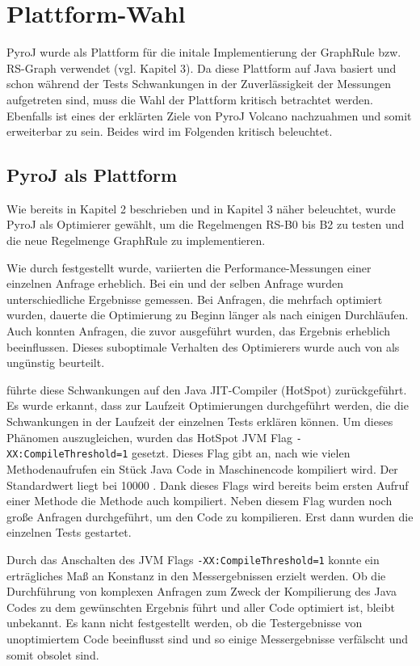 \section{Plattform-Wahl}

PyroJ wurde als Plattform für die initale Implementierung der GraphRule bzw. RS-Graph verwendet (vgl. Kapitel 3). Da diese Plattform auf Java basiert und schon während der Tests Schwankungen in der Zuverlässigkeit der Messungen aufgetreten sind, muss die Wahl der Plattform kritisch betrachtet werden. Ebenfalls ist eines der erklärten Ziele von PyroJ Volcano nachzuahmen und somit erweiterbar zu sein. Beides wird im Folgenden kritisch beleuchtet.


\subsection{PyroJ als Plattform}

Wie bereits in Kapitel 2 beschrieben und in Kapitel 3 näher beleuchtet, wurde PyroJ als Optimierer gewählt, um die Regelmengen RS-B0 bis B2 zu testen und die neue Regelmenge GraphRule zu implementieren.

Wie durch \cite{shanbhag2014optimizing} festgestellt wurde, variierten die Performance-Messungen einer einzelnen Anfrage erheblich. Bei ein und der selben Anfrage wurden unterschiedliche Ergebnisse gemessen. Bei Anfragen, die mehrfach optimiert wurden, dauerte die Optimierung zu Beginn länger als nach einigen Durchläufen. Auch konnten Anfragen, die zuvor ausgeführt wurden, das Ergebnis erheblich beeinflussen. Dieses suboptimale Verhalten des Optimierers wurde auch von \cite{shanbhag2014optimizing} als ungünstig beurteilt.

\cite{shanbhag2014optimizing} führte diese Schwankungen auf den Java JIT-Compiler (HotSpot) zurückgeführt. Es wurde erkannt, dass zur Laufzeit Optimierungen durchgeführt werden, die die Schwankungen in der Laufzeit der einzelnen Tests erklären können. Um dieses Phänomen auszugleichen, wurden das HotSpot JVM Flag \texttt{-XX:CompileThreshold=1} gesetzt. Dieses Flag gibt an, nach wie vielen Methodenaufrufen ein Stück Java Code in Maschinencode kompiliert wird. Der Standardwert liegt bei 10000 \cite{oracle2015VMOptions}. Dank dieses Flags wird bereits beim ersten Aufruf einer Methode die Methode auch kompiliert. Neben diesem Flag wurden noch große Anfragen durchgeführt, um den Code zu kompilieren. Erst dann wurden die einzelnen Tests gestartet.


Durch das Anschalten des JVM Flags \texttt{-XX:CompileThreshold=1} konnte ein erträgliches Maß an Konstanz in den Messergebnissen erzielt werden. 
Ob die Durchführung von komplexen Anfragen zum Zweck der Kompilierung des Java Codes zu dem gewünschten Ergebnis führt und aller Code optimiert ist, bleibt unbekannt. Es kann nicht festgestellt werden, ob die Testergebnisse von unoptimiertem Code beeinflusst sind und so einige Messergebnisse verfälscht und somit obsolet sind.

